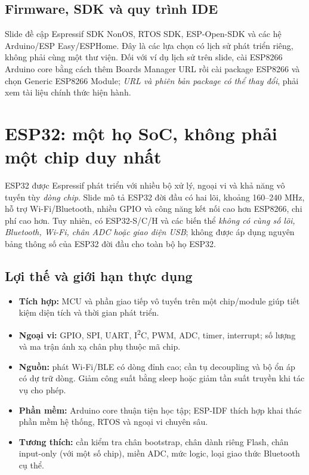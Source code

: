 \subsection{Firmware, SDK và quy trình IDE}
Slide đề cập Espressif SDK NonOS, RTOS SDK, ESP-Open-SDK và các hệ Arduino/ESP Easy/ESPHome. Đây là các lựa chọn có lịch sử phát triển riêng, không phải cùng một thư viện. Đối với ví dụ lịch sử trên slide, cài ESP8266 Arduino core bằng cách thêm Boards Manager URL rồi cài package ESP8266 và chọn Generic ESP8266 Module; \emph{URL và phiên bản package có thể thay đổi}, phải xem tài liệu chính thức hiện hành.

\section{ESP32: một họ SoC, không phải một chip duy nhất}
ESP32 được Espressif phát triển với nhiều bộ xử lý, ngoại vi và khả năng vô tuyến tùy \emph{dòng chip}. Slide mô tả ESP32 đời đầu có hai lõi, khoảng 160--240 MHz, hỗ trợ Wi-Fi/Bluetooth, nhiều GPIO và công năng kết nối cao hơn ESP8266, chi phí cao hơn. Tuy nhiên, có ESP32-S/C/H và các biến thể \emph{không có cùng số lõi, Bluetooth, Wi-Fi, chân ADC hoặc giao diện USB}; không được áp dụng nguyên bảng thông số của ESP32 đời đầu cho toàn bộ họ ESP32.

\subsection{Lợi thế và giới hạn thực dụng}
\begin{itemize}
\item \textbf{Tích hợp:} MCU và phần giao tiếp vô tuyến trên một chip/module giúp tiết kiệm diện tích và thời gian phát triển.
\item \textbf{Ngoại vi:} GPIO, SPI, UART, I\textsuperscript{2}C, PWM, ADC, timer, interrupt; số lượng và ma trận ánh xạ chân phụ thuộc mã chip.
\item \textbf{Nguồn:} phát Wi-Fi/BLE có dòng đỉnh cao; cần tụ decoupling và bộ ổn áp có dự trữ dòng. Giảm công suất bằng sleep hoặc giảm tần suất truyền khi tác vụ cho phép.
\item \textbf{Phần mềm:} Arduino core thuận tiện học tập; ESP-IDF thích hợp khai thác phần mềm hệ thống, RTOS và ngoại vi chuyên sâu.
\item \textbf{Tương thích:} cần kiểm tra chân bootstrap, chân dành riêng Flash, chân input-only (với một số chip), miền ADC, mức logic, loại giao thức Bluetooth cụ thể.
\end{itemize}

